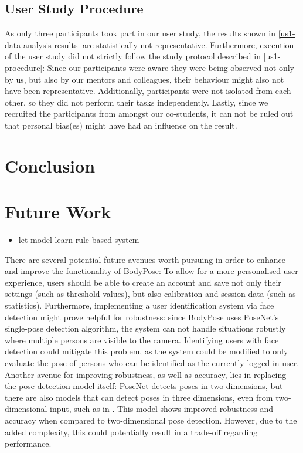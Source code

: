 \subsection{User Study Procedure}
As only three participants took part in our user study, the results shown in \ref{us1-data-analysis-results} are statistically not representative. Furthermore, execution of the user study did not strictly follow the study protocol described in \ref{us1-procedure}: Since our participants were aware they were being observed not only by us, but also by our mentors and colleagues, their behaviour might also not have been representative. Additionally, participants were not isolated from each other, so they did not perform their tasks independently. Lastly, since we recruited the participants from amongst our co-students, it can not be ruled out that personal bias(es) might have had an influence on the result.

\section{Conclusion} %
\label{conclusion}

\section{Future Work}
\begin{itemize}
    \item let model learn rule-based system
\end{itemize}
There are several potential future avenues worth pursuing in order to enhance and improve the functionality of BodyPose: To allow for a more personalised user experience, users should be able to create an account and save not only their settings (such as threshold values), but also calibration and session data (such as statistics). Furthermore, implementing a user identification system via face detection might prove helpful for robustness: since BodyPose uses PoseNet's single-pose detection algorithm, the system can not handle situations robustly where multiple persons are visible to the camera. Identifying users with face detection could mitigate this problem, as the system could be modified to only evaluate the pose of persons who can be identified as the currently logged in user. Another avenue for improving robustness, as well as accuracy, lies in replacing the pose detection model itself: PoseNet detects poses in two dimensions, but there are also models that can detect poses in three dimensions, even from two-dimensional input, such as in \cite{Arnab_2019}. This model shows improved robustness and accuracy when compared to two-dimensional pose detection. However, due to the added complexity, this could potentially result in a trade-off regarding performance.

